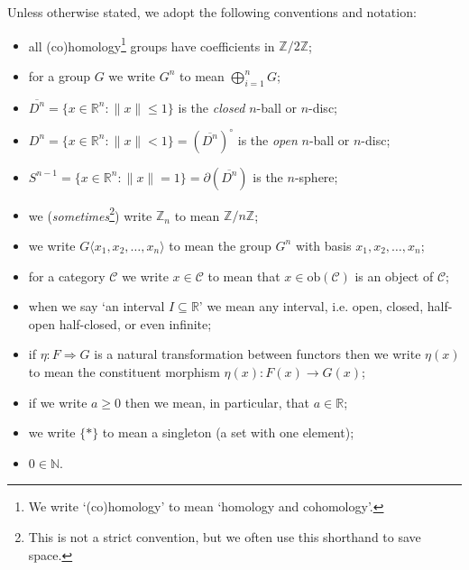 \documentclass[12pt]{article}
\numberwithin{equation}{subsection}
\numberwithin{theorem}{subsection}
\numberwithin{lemma}{subsection}
\numberwithin{corollary}{subsection}
\numberwithin{definition}{subsection}
\numberwithin{example}{subsection}
\numberwithin{note}{subsection}
\newcommand{\zz}{\mathbb{Z}}
\newcommand{\rr}{\mathbb{R}}
\newcommand{\nn}{\mathbb{N}}
\newcommand{\ccat}{\mathcal{C}}
\newcommand{\nt}{\Rightarrow}
\begin{document}
            Unless otherwise stated, we adopt the following conventions and notation:
            \begin{itemize}
                \item all (co)homology\footnote{
                    We write `(co)homology' to mean `homology and cohomology'.
                } groups have coefficients in $\zz/2\zz$;
                \item for a group $G$ we write $G^n$ to mean $\bigoplus_{i=1}^n G$;
                \item $\overline{D^n}=\{x\in\rr^n : \|x\|\leqslant1\}$ is the \emph{closed} $n$-ball or $n$-disc;
                \item $D^n=\{x\in\rr^n : \|x\| < 1\}=(\overline{D^n})^\circ$ is the \emph{open} $n$-ball or $n$-disc;
                \item $S^{n-1}=\{x\in\rr^n : \|x\|=1\}=\partial(\overline{D^n})$ is the $n$-sphere;
                \item we (\emph{sometimes}\footnote{
                    This is not a strict convention, but we often use this shorthand to save space.
                }) write $\zz_n$ to mean $\zz/n\zz$;
                \item we write $G\langle x_1,x_2,\ldots,x_n\rangle$ to mean the group $G^n$ with basis $x_1,x_2,\ldots,x_n$;
                \item for a category $\ccat$ we write $x\in\ccat$ to mean that $x\in\mathrm{ob}(\ccat)$ is an object of $\ccat$;
                \item when we say `an interval $I\subseteq\rr$' we mean any interval, i.e. open, closed, half-open half-closed, or even infinite;
                \item if $\eta\colon F\nt G$ is a natural transformation between functors then we write $\eta(x)$ to mean the constituent morphism $\eta(x)\colon F(x)\to G(x)$;
                \item if we write $a\geqslant0$ then we mean, in particular, that $a\in\rr$;
                \item we write $\{*\}$ to mean a singleton (a set with one element);
                \item $0\in\nn$.
            \end{itemize}
\end{document}
